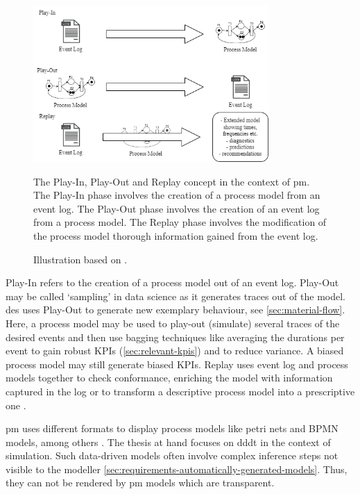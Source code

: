 \begin{figure}[htbp]
    \centering
    \includegraphics[width=0.8\textwidth]{figures/playinplayoutreplay.png}
    \caption[Process Model Usages]{The Play-In, Play-Out and Replay concept in the context of \gls{pm}. The Play-In phase involves the creation of a process model from an event log. The Play-Out phase involves the creation of an event log from a process model. The Replay phase involves the modification of the process model thorough information gained from the event log.}
    \label{fig:playinoutreplay}
    \caption*{Illustration based on \textcite{damm2001lscs}.}
\end{figure}

Play-In refers to the creation of a process model out of an event log. Play-Out may be called `sampling' in data science as it generates traces out of the model. \gls{des} uses Play-Out to generate new exemplary behaviour, see \autoref{sec:material-flow}. Here, a process model may be used to play-out (simulate) several traces of the desired events and then use bagging techniques like averaging the durations per event to gain robust KPIs (\autoref{sec:relevant-kpis}) and to reduce variance. A biased process model may still generate biased KPIs. Replay uses event log and process models together to check conformance, enriching the model with information captured in the log or to transform a descriptive process model into a prescriptive one \autocite{van2016data}.

\gls{pm} uses different formats to display process models like petri nets and BPMN models, among others \autocite{vanderAalst2012}. The thesis at hand focuses on \gls{dddt} in the context of simulation. Such data-driven models often involve complex inference steps not visible to the modeller \autoref{sec:requirements-automatically-generated-models}. Thus, they can not be rendered by \gls{pm} models which are transparent.

